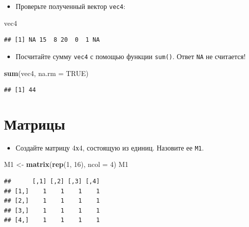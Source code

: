 \documentclass[]{book}
\newenvironment{Shaded}{\begin{snugshade}}{\end{snugshade}}
\newcommand{\KeywordTok}[1]{\textcolor[rgb]{0.13,0.29,0.53}{\textbf{#1}}}
\newcommand{\DataTypeTok}[1]{\textcolor[rgb]{0.13,0.29,0.53}{#1}}
\newcommand{\DecValTok}[1]{\textcolor[rgb]{0.00,0.00,0.81}{#1}}
\newcommand{\StringTok}[1]{\textcolor[rgb]{0.31,0.60,0.02}{#1}}
\newcommand{\OtherTok}[1]{\textcolor[rgb]{0.56,0.35,0.01}{#1}}
\newcommand{\NormalTok}[1]{#1}
\providecommand{\tightlist}{%
  \setlength{\itemsep}{0pt}\setlength{\parskip}{0pt}}
\begin{document}
\begin{itemize}
\tightlist
\item
  Проверьте полученный вектор \texttt{vec4}:
\end{itemize}

\begin{Shaded}
\begin{Highlighting}[]
\NormalTok{vec4}
\end{Highlighting}
\end{Shaded}

\begin{verbatim}
## [1] NA 15  8 20  0  1 NA
\end{verbatim}

\begin{itemize}
\tightlist
\item
  Посчитайте сумму \texttt{vec4} с помощью функции \texttt{sum()}. Ответ
  \texttt{NA} не считается!
\end{itemize}

\begin{Shaded}
\begin{Highlighting}[]
\KeywordTok{sum}\NormalTok{(vec4, }\DataTypeTok{na.rm =} \OtherTok{TRUE}\NormalTok{)}
\end{Highlighting}
\end{Shaded}

\begin{verbatim}
## [1] 44
\end{verbatim}

\section{Матрицы}\label{solution_matrix}

\begin{itemize}
\tightlist
\item
  Создайте матрицу 4х4, состоящую из единиц. Назовите ее \texttt{M1}.
\end{itemize}

\begin{Shaded}
\begin{Highlighting}[]
\NormalTok{M1 <-}\StringTok{ }\KeywordTok{matrix}\NormalTok{(}\KeywordTok{rep}\NormalTok{(}\DecValTok{1}\NormalTok{, }\DecValTok{16}\NormalTok{), }\DataTypeTok{ncol =} \DecValTok{4}\NormalTok{)}
\NormalTok{M1}
\end{Highlighting}
\end{Shaded}

\begin{verbatim}
##      [,1] [,2] [,3] [,4]
## [1,]    1    1    1    1
## [2,]    1    1    1    1
## [3,]    1    1    1    1
## [4,]    1    1    1    1
\end{verbatim}
\end{document}
